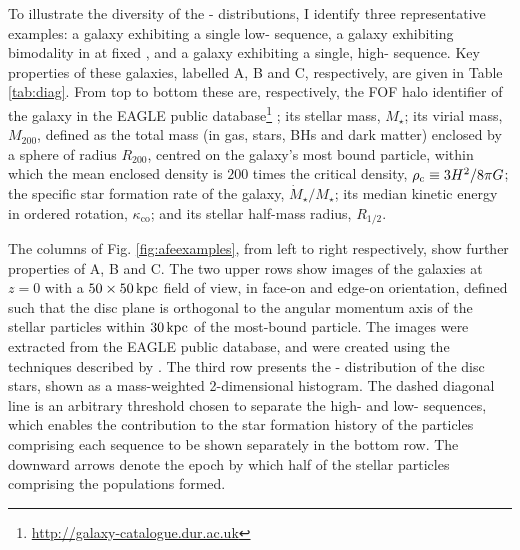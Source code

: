To illustrate the diversity of the \afe{}-\feh{} distributions, I identify three representative examples: a galaxy exhibiting a single low-\afe{} sequence, a galaxy exhibiting bimodality in \afe{} at fixed \feh{}, and a galaxy exhibiting a single, high-\afe{} sequence. Key properties of these galaxies, labelled A, B and C, respectively, are given in Table \ref{tab:diag}. From top to bottom these are, respectively, the FOF halo identifier of the galaxy in the EAGLE public database\footnote{\url{http://galaxy-catalogue.dur.ac.uk}} \citep{2016A&C....15...72M}; its stellar mass, $M_\star$; its virial mass, $M_{200}$, defined as the total mass (in gas, stars, BHs and dark matter) enclosed by a sphere of radius $R_{200}$, centred on the galaxy's most bound particle, within which the mean enclosed density is $200$ times the critical density, $\rho_{\rm c} \equiv 3H^2/8\pi G$; the specific star formation rate of the galaxy, $\dot{M}_\star/M_\star$; its median kinetic energy in ordered rotation, $\kappa_{\mathrm{co}}$; and its stellar half-mass radius, $R_{1/2}$. 

The columns of Fig. \ref{fig:afeexamples}, from left to right respectively, show further properties of A, B and C. The two upper rows show images of the galaxies at $z=0$ with a $50 \times 50\,{\rm kpc}$ field of view, in face-on and edge-on orientation, defined such that the disc plane is orthogonal to the angular momentum axis of the stellar particles within $30\,{\rm kpc}$ of the most-bound particle. The images were extracted from the EAGLE public database, and were created using the techniques described by \citet{2015MNRAS.452.2879T}. The third row presents the \afe{}-\feh{} distribution of the disc stars, shown as a mass-weighted 2-dimensional histogram. The dashed diagonal line is an arbitrary threshold chosen to separate the high- and low-\afe{} sequences, which enables the contribution to the star formation history of the particles comprising each sequence to be shown separately in the bottom row. The downward arrows denote the epoch by which half of the stellar particles comprising the populations formed. 

